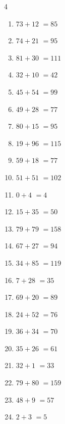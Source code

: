 \begin{multicols}{4}
\begin{enumerate}
  \item $73+12$
        $=85$

  \item $74+21$
        $=95$

  \item $81+30$
        $=111$

  \item $32+10$
        $=42$

  \item $45+54$
        $=99$

  \item $49+28$
        $=77$

  \item $80+15$
        $=95$

  \item $19+96$
        $=115$

  \item $59+18$
        $=77$

  \item $51+51$
        $=102$

  \item $0+4$
        $=4$

  \item $15+35$
        $=50$

  \item $79+79$
        $=158$

  \item $67+27$
        $=94$

  \item $34+85$
        $=119$

  \item $7+28$
        $=35$

  \item $69+20$
        $=89$

  \item $24+52$
        $=76$

  \item $36+34$
        $=70$

  \item $35+26$
        $=61$

  \item $32+1$
        $=33$

  \item $79+80$
        $=159$

  \item $48+9$
        $=57$

  \item $2+3$
        $=5$


\end{enumerate}
\end{multicols}
